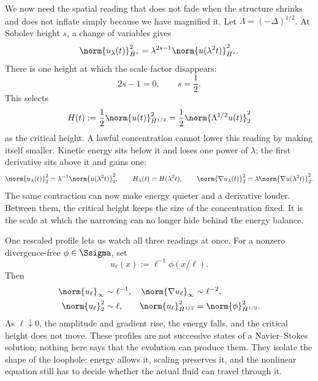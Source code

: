 We now need the spatial reading that does not fade when the structure shrinks
and does not inflate simply because we have magnified it.  Let
\(\Lambda=(-\Delta)^{1/2}\).  At Sobolev height \(s\), a change of variables
gives
\begin{equation}\label{eq:BodyHomogeneousSobolevScaling}
  \norm{u_\lambda(t)}_{\dot H^s}^2
  =\lambda^{2s-1}\norm{u(\lambda^2t)}_{\dot H^s}^2.
\end{equation}
There is one height at which the scale factor disappears:
\[
  2s-1=0,
  \qquad
  s=\frac12.
\]
This selects
\begin{equation}\label{eq:BodyCriticalHeightDefinition}
  H(t):=\frac12\norm{u(t)}_{\dot H^{1/2}}^2
  =\frac12\norm{\Lambda^{1/2}u(t)}_2^2
\end{equation}
as the critical height.  A lawful concentration cannot lower this reading by
making itself smaller.  Kinetic energy sits below it and loses one power of
\(\lambda\); the first derivative sits above it and gains one:
\[
  \norm{u_\lambda(t)}_2^2
  =\lambda^{-1}\norm{u(\lambda^2t)}_2^2,
  \qquad
  H_\lambda(t)=H(\lambda^2t),
  \qquad
  \norm{\nabla u_\lambda(t)}_2^2
  =\lambda\norm{\nabla u(\lambda^2t)}_2^2.
\]
The same contraction can now make energy quieter and a derivative louder.
Between them, the critical height keeps the size of the concentration fixed.
It is the scale at which the narrowing can no longer hide behind the energy
balance.

One rescaled profile lets us watch all three readings at once.  For a nonzero
divergence-free \(\phi\in\Ssigma\), set
\[
  u_\ell(x):=\ell^{-1}\phi(x/\ell).
\]
Then
\[
\begin{aligned}
  \norm{u_\ell}_\infty&\sim\ell^{-1},
  &\norm{\nabla u_\ell}_\infty&\sim\ell^{-2},
  \\
  \norm{u_\ell}_2^2&\sim\ell,
  &\norm{u_\ell}_{\dot H^{1/2}}^2
  &=\norm{\phi}_{\dot H^{1/2}}^2.
\end{aligned}
\]
As \(\ell\downarrow0\), the amplitude and gradient rise, the energy falls, and
the critical height does not move.  These profiles are not successive states
of a Navier--Stokes solution; nothing here says that the evolution can produce
them.  They isolate the shape of the loophole: energy allows it, scaling
preserves it, and the nonlinear equation still has to decide whether the
actual fluid can travel through it.

